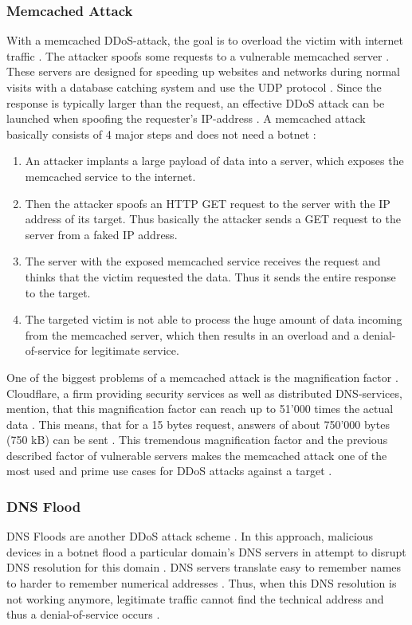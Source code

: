 \subsubsection*{Memcached Attack}
With a memcached DDoS-attack, the goal is to overload the victim with internet traffic \cite{CloudFlare-Memcached}. The attacker spoofs some requests to a vulnerable memcached server \cite{CloudFlare-Memcached}. These servers are designed for speeding up websites and networks during normal visits with a database catching system and use the UDP protocol \cite{CloudFlare-Memcached}. Since the response is typically larger than the request, an effective DDoS attack can be launched when spoofing the requester's IP-address \cite{CloudFlare-Memcached}. A memcached attack basically consists of 4 major steps and does not need a botnet \cite{CloudFlare-Memcached}: 
\begin{enumerate}
    \item An attacker implants a large payload of data into a server, which exposes the memcached service to the internet.
    \item Then the attacker spoofs an HTTP GET request to the server with the IP address of its target. Thus basically the attacker sends a GET request to the server from a faked IP address. 
    \item The server with the exposed memcached service receives the request and thinks that the victim requested the data. Thus it sends the entire response to the target.
    \item The targeted victim is not able to process the huge amount of data incoming from the memcached server, which then results in an overload and a denial-of-service for legitimate service. 
\end{enumerate}

One of the biggest problems of a memcached attack is the magnification factor \cite{CloudFlare-Memcached}. Cloudflare, a firm providing security services as well as distributed DNS-services, mention, that this magnification factor can reach up to 51'000 times the actual data \cite{CloudFlare-Memcached}. This means, that for a 15 bytes request, answers of about 750'000 bytes (750 kB) can be sent \cite{CloudFlare-Memcached}. This tremendous magnification factor and the previous described factor of vulnerable servers makes the memcached attack one of the most used and prime use cases for DDoS attacks against a target \cite{CloudFlare-Memcached}. 

\subsubsection*{DNS Flood}
DNS Floods are another DDoS attack scheme \cite{Cloudflare-DNSFlood}. In this approach, malicious devices in a botnet flood a particular domain's DNS servers in attempt to disrupt DNS resolution for this domain \cite{Cloudflare-DNSFlood}. DNS servers translate easy to remember names to harder to remember numerical addresses \cite{Cloudflare-DNSFlood}. Thus, when this DNS resolution is not working anymore, legitimate traffic cannot find the technical address and thus a denial-of-service occurs \cite{Cloudflare-DNSFlood}. 

